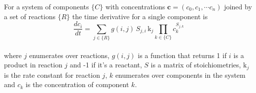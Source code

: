 \documentclass[10pt]{article}
\begin{document}
For a system of components $\{C\}$ with concentrations $\boldsymbol{c} = (c_0, c_1, \cdots c_n)$ joined by a set of reactions $\{R\}$ the time derivative for a single component is
\\
\begin{equation}
\frac{dc_i}{dt} = \sum_{j \in \{R\}} g(i, j)\, S_{j, i}\, \mathrm{k}_j  \prod_{k \in \{C\}} c_k^{S_{j, k}}
\end{equation}
\\
where $j$ enumerates over reactions, $g(i, j)$ is a function that returns 1 if $i$ is a product in reaction $j$ and -1 if it's a reactant, $S$ is a matrix of stoichiometries, $\mathrm{k}_j$ is the rate constant for reaction $j$, $k$ enumerates over components in the system and $c_k$ is the concentration of component $k$.
\end{document}
